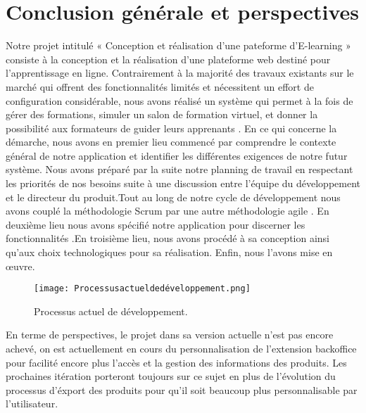 
\chapter*{Conclusion générale et perspectives}
\label{sec:conclusion}
Notre projet intitulé « Conception et réalisation d’une pateforme d’E-learning » consiste à la conception et la réalisation d’une plateforme web destiné pour l’apprentissage en ligne.
\medskip
Contrairement à la majorité des travaux existants sur le marché qui offrent des fonctionnalités
limités et nécessitent un effort de configuration considérable, nous avons réalisé un système
qui permet à la fois de gérer des formations, simuler un salon de formation virtuel, et donner la possibilité aux formateurs de guider leurs apprenants .
\medskip
En ce qui concerne la démarche, nous avons en premier lieu 
commencé  par comprendre le contexte général de notre application et identifier les différentes exigences de notre futur système. Nous avons préparé par la suite notre planning de travail en respectant les priorités de nos besoins suite à une discussion entre l'équipe du développement et le directeur du produit.Tout au long de notre cycle de développement nous avons couplé la méthodologie Scrum par une autre méthodologie agile . En deuxième lieu nous avons spécifié notre application pour
discerner les fonctionnalités .En troisième lieu, nous avons procédé à sa conception ainsi
qu’aux choix technologiques pour sa réalisation. Enfin, nous l’avons mise en œuvre.
	\begin{figure}[ht]
	\centering
	\texttt{[image: Processusactueldedéveloppement.png]}
	\caption{Processus actuel de développement.}
	\label{fig:Processus actuel de développement }
\end{figure}
\FloatBarrier
\medskip
En terme de perspectives, le projet dans sa version actuelle n’est pas encore achevé, on est actuellement en cours du personnalisation de l'extension backoffice pour facilité encore plus l'accès et la gestion des informations des produits. Les prochaines itération porteront toujours sur ce sujet en plus de l'évolution du processus d'éxport des produits pour qu'il soit beaucoup plus personnalisable par l'utilisateur.
\medskip
    




























  


